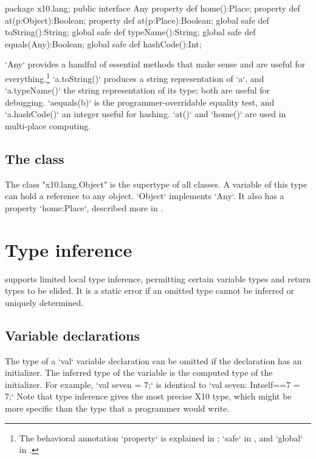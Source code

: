 {\begin{xten}
package x10.lang;
public interface Any {
  property def home():Place;
  property def at(p:Object):Boolean;
  property def at(p:Place):Boolean;
  global safe def toString():String;
  global safe def typeName():String;
  global safe def equals(Any):Boolean;
  global safe def hashCode():Int;
}
\end{xten}

\xcd`Any` provides a handful of essential methods that make sense and are
useful for everything.\footnote{The behavioral annotation \xcd`property` is
  explained in ; \xcd`safe` in , and
  \xcd`global` in .} \xcd`a.toString()` produces a
string representation of \xcd`a`, and \xcd`a.typeName()` the string
representation of its type; both are useful for debugging.  \xcd`aequals(b)`
is the programmer-overridable equality test, and \xcd`a.hashCode()` an integer
useful for hashing.  \xcd`at()` and \xcd`home()` are used in multi-place
computing. 


\subsection{The class }
\label{Object}

The class \xcd"x10.lang.Object" is the supertype of all classes.
A variable of this type can hold a reference to any object.
\xcd`Object` implements \xcd`Any`. It also has a property \xcd`home:Place`,
described more in .



\section{Type inference}
\label{TypeInference}

\XtenCurrVer{} supports limited local type inference, permitting
certain variable types and return types to be elided.
It is a static error if an omitted type cannot be inferred or
uniquely determined.

\subsection{Variable declarations}

The type of a \xcd`val` variable declaration can be omitted if the
declaration has an initializer.  The inferred type of the
variable is the computed type of the initializer.
For example, 
\xcd`val seven = 7;`
is identical to 
\xcd`val seven: Int{self==7} = 7;`
Note that type inference gives the most precise X10 type, which might be more
specific than the type that a programmer would write.

}
